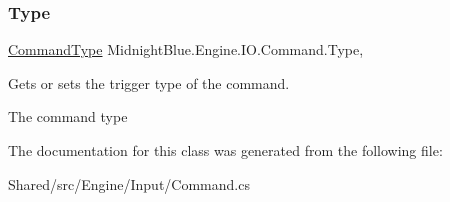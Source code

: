 \subsubsection{\texorpdfstring{Type}{Type}}
{\footnotesize\ttfamily \hyperlink{namespace_midnight_blue_1_1_engine_1_1_i_o_a8bc3f159399ecadd590f7df1b54354b0}{Command\+Type} Midnight\+Blue.\+Engine.\+I\+O.\+Command.\+Type\hspace{0.3cm}{\ttfamily [get]}, {\ttfamily [set]}}



Gets or sets the trigger type of the command. 

The command type

The documentation for this class was generated from the following file\+:\begin{DoxyCompactItemize}
\item 
Shared/src/\+Engine/\+Input/Command.\+cs\end{DoxyCompactItemize}
